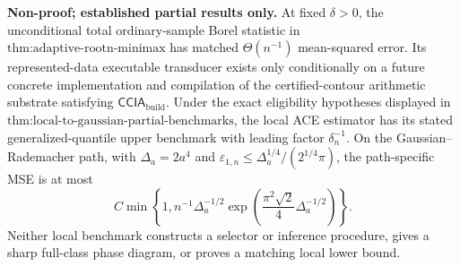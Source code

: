 \textbf{Non-proof; established partial results only.}  At fixed \(\delta>0\), the unconditional total ordinary-sample Borel statistic in \(\text{thm:adaptive-rootn-minimax}\) has matched \(\Theta(n^{-1})\) mean-squared error.  Its represented-data executable transducer exists only conditionally on a future concrete implementation and compilation of the certified-contour arithmetic substrate satisfying \(\mathsf{CCIA}_{\mathrm{build}}\).  Under the exact eligibility hypotheses displayed in \(\text{thm:local-to-gaussian-partial-benchmarks}\), the local ACE estimator has its stated generalized-quantile upper benchmark with leading factor \(\delta_n^{-1}\).  On the Gaussian--Rademacher path, with \(\Delta_a=2a^4\) and \(\varepsilon_{1,n}\le\Delta_a^{1/4}/(2^{1/4}\pi)\), the path-specific MSE is at most
\[
 C\min\!\left\{1,
 n^{-1}\Delta_a^{-1/2}
 \exp\!\left(\frac{\pi^2\sqrt2}{4}\Delta_a^{-1/2}\right)\right\}.
\]
Neither local benchmark constructs a selector or inference procedure, gives a sharp full-class phase diagram, or proves a matching local lower bound.
